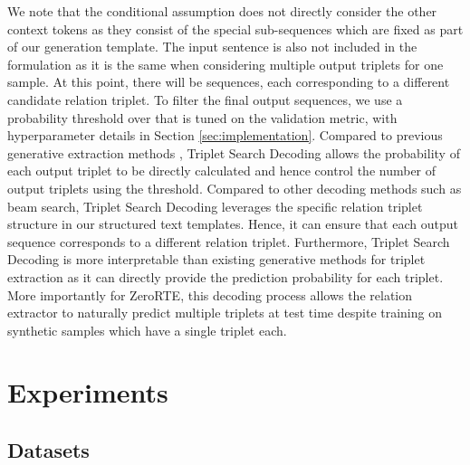 \documentclass[11pt]{article}
\begin{document}
We note that the conditional assumption does not directly consider the other context tokens as they consist of the special sub-sequences which are fixed as part of our generation template.
The input sentence  is also not included in the formulation as it is the same when considering multiple output triplets for one sample.
At this point, there will be  sequences, each corresponding to a different candidate relation triplet.
To filter the final output sequences, we use a probability threshold over that is tuned on the validation  metric, with hyperparameter details in Section \ref{sec:implementation}.
Compared to previous generative extraction methods \cite{paolini2020structured, nayak2020effective}, Triplet Search Decoding allows the probability  of each output triplet to be directly calculated and hence control the number of output triplets using the threshold. 
Compared to other decoding methods such as beam search, Triplet Search Decoding leverages the specific relation triplet structure in our structured text templates.
Hence, it can ensure that each output sequence corresponds to a different relation triplet. 
Furthermore, Triplet Search Decoding is more interpretable than existing generative methods for triplet extraction as it can directly provide the prediction probability for each triplet.
More importantly for ZeroRTE, this decoding process allows the relation extractor to naturally predict multiple triplets at test time despite training on synthetic samples which have a single triplet each.







\section{Experiments}
\subsection{Datasets}
\label{sec:exp_data}
\end{document}
